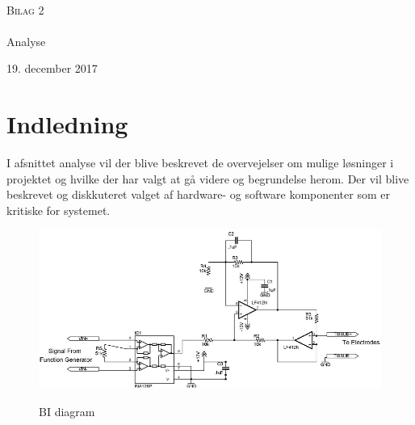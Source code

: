 \documentclass[main.tex]{subfiles}
\begin{document}
\begin{titlingpage}
\begin{center}

~ \\[3cm]


\textsc{\LARGE Bilag 2}\\[1.5cm]


\noindent\makebox[\linewidth]{\rule{\textwidth}{0.4pt}}\\
[0.5cm]{\Huge Analyse}
\noindent\makebox[\linewidth]{\rule{\textwidth}{0.4pt}}
\end{center}
\vfill
\begin{center}
{\large 19. december 2017}
\end{center}
\end{titlingpage}

\newpage
\tableofcontents*
\newpage

\chapter{Indledning}


I afsnittet analyse vil der blive beskrevet de overvejelser om mulige løsninger i projektet og hvilke der har valgt at gå videre og begrundelse herom. Der vil blive beskrevet og diskkuteret valget af hardware- og software komponenter som er kritiske for systemet. 


\begin{figure}[H]
\centering
{\includegraphics[width=\linewidth]
{Figure/BIdiagram}}
\caption{BI diagram\cite{Aroom2009}}
\label{trefaser}
\end{figure}
\end{document}

